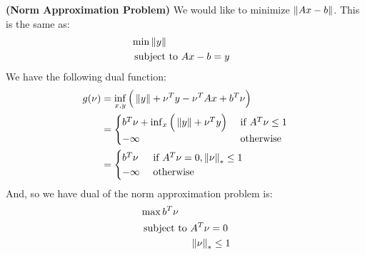 \begin{remark}{\textbf{(Norm Approximation Problem)}}
    We would like to minimize $\left\lVert Ax-b\right\rVert$. This is the same as:
    \begin{equation*}
    \begin{aligned}
        &\min \left\lVert y\right\rVert \\
        &\text{ subject to } \begin{aligned}[t]
            &Ax-b=y
        \end{aligned}
    \end{aligned}
    \end{equation*}
    We have the following dual function: 
    \begin{equation*}
    \begin{aligned}
        g(\nu) &= \inf_{x, y}\Big( \left\lVert y\right\rVert + \nu^Ty - \nu^TAx + b^T\nu \Big)\\
        &= \begin{cases}
            b^T\nu + \inf_x\Big( \left\lVert y\right\rVert + \nu^Ty \Big) &\text{ if } A^T\nu\le1 \\
            -\infty &\text{ otherwise } 
        \end{cases} \\
        &= \begin{cases}
            b^T\nu &\text{ if } A^T\nu=0, \left\lVert\nu\right\rVert_*\le1 \\
            -\infty &\text{ otherwise }
        \end{cases}
    \end{aligned}
    \end{equation*}
    And, so we have dual of the norm approximation problem is:
    \begin{equation*}
    \begin{aligned}
        &\max b^T\nu \\
        &\text{ subject to } \begin{aligned}[t]
            &A^T\nu=0 \\
            &\left\lVert\nu\right\rVert_*\le1
        \end{aligned}
    \end{aligned}
    \end{equation*}
\end{remark}

